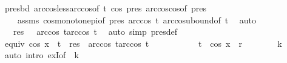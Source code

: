 \begin{isabellebody}
\ presbd\ arccos{\isacharunderscore}{\kern0pt}less{\isacharunderscore}{\kern0pt}arccos{\isacharbrackleft}{\kern0pt}of\ t\ {\isachardoublequoteopen}cos\ pres{\isachardoublequoteclose}{\isacharbrackright}{\kern0pt}\ arccos{\isacharunderscore}{\kern0pt}cos{\isacharbrackleft}{\kern0pt}of\ pres{\isacharbrackright}{\kern0pt}\isanewline
\ \ \ \ assms\ cos{\isacharunderscore}{\kern0pt}monotone{\isacharunderscore}{\kern0pt}{}{\isacharunderscore}{\kern0pt}pi{\isacharbrackleft}{\kern0pt}of\ pres\ {\isachardoublequoteopen}arccos\ t{\isachardoublequoteclose}{\isacharbrackright}{\kern0pt}\ arccos{\isacharunderscore}{\kern0pt}ubound{\isacharbrackleft}{\kern0pt}of\ t{\isacharbrackright}{\kern0pt}\ \isamarkupfalse%
\ auto\isanewline
\ \ \isamarkupfalse%
\ \isamarkupfalse%
\ {\isachardoublequoteopen}{\isasymdots}\ {\isasymlongleftrightarrow}\ res\ {\isasymin}\ {\isacharbraceleft}{\kern0pt}{\isacharminus}{\kern0pt}\ arccos\ t{\isacharless}{\kern0pt}{\isachardot}{\kern0pt}{\isachardot}{\kern0pt}{\isacharless}{\kern0pt}arccos\ t{\isacharbraceright}{\kern0pt}{\isachardoublequoteclose}\ \isamarkupfalse%
\ {\isacharparenleft}{\kern0pt}auto\ simp{\isacharcolon}{\kern0pt}\ pres{\isacharunderscore}{\kern0pt}def{\isacharparenright}{\kern0pt}\isanewline
\ \ \isamarkupfalse%
\ \isamarkupfalse%
\ equiv{\isacharcolon}{\kern0pt}\ {\isachardoublequoteopen}cos\ x\ {\isachargreater}{\kern0pt}\ t\ {\isasymlongleftrightarrow}\ res\ {\isasymin}\ {\isacharbraceleft}{\kern0pt}{\isacharminus}{\kern0pt}arccos\ t{\isacharless}{\kern0pt}{\isachardot}{\kern0pt}{\isachardot}{\kern0pt}{\isacharless}{\kern0pt}arccos\ t{\isacharbraceright}{\kern0pt}{\isachardoublequoteclose}\ \isakeywordONE{{\isachardot}{\kern0pt}}\isamarkupfalse%
\isanewline
\ \ \isakeywordONE{{\isacharbraceleft}{\kern0pt}}\isamarkupfalse%
\isanewline
\ \ \ \ \isamarkupfalse%
\ \isamarkupfalse%
\ {\isachardoublequoteopen}t\ {\isacharless}{\kern0pt}\ cos\ x\ {\isasymLongrightarrow}\ {\isacharquery}{\kern0pt}r{\isachardoublequoteclose}\isanewline
\ \ \ \ \ \ \isamarkupfalse%
\ k\ \isamarkupfalse%
\ {\isacharparenleft}{\kern0pt}auto\ intro{\isacharcolon}{\kern0pt}\ exI{\isacharbrackleft}{\kern0pt}of\ {\isacharunderscore}{\kern0pt}\ k{\isacharbrackright}{\kern0pt}{\isacharparenright}{\kern0pt}\isanewline
\ \ \isakeywordONE{{\isacharbraceright}{\kern0pt}}\isamarkupfalse%
\isanewline
\ \ \isakeywordONE{{\isacharbraceleft}{\kern0pt}}\isamarkupfalse%

\end{isabellebody}
